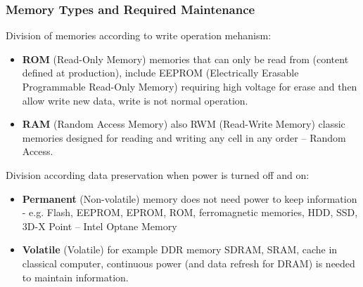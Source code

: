 \documentclass{beamer}
\begin{document}
\begin{frame}
\frametitle{Memory Types and Required Maintenance}

Division of memories according to write operation mehanism:

\begin{itemize}
\item \textbf{ROM} (Read-Only Memory) memories that can only be read from (content defined at production), include EEPROM (Electrically Erasable Programmable Read-Only Memory) requiring high voltage for erase and then allow write new data, write is not normal operation.
\item \textbf{RAM} (Random Access Memory) also RWM (Read-Write Memory) classic memories designed for reading and writing any cell in any order -- Random Access.
\end{itemize}

Division according data preservation when power is turned off and on:
\begin{itemize}
\item \textbf{Permanent} (Non-volatile) memory does not need power to keep information - e.g. Flash, EEPROM, EPROM, ROM, ferromagnetic memories, HDD, SSD, 3D-X Point -- Intel Optane Memory
\item \textbf{Volatile} (Volatile) for example DDR memory SDRAM, SRAM, cache in classical computer, continuous power (and data refresh for DRAM) is needed to maintain information.
\end{itemize}

\end{frame}
\end{document}
